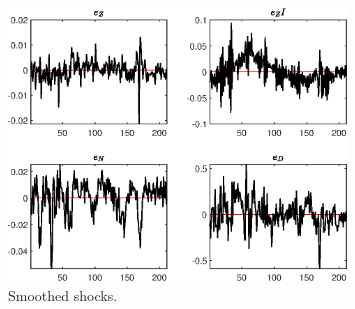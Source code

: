  
\begin{figure}[H]
\centering 
\includegraphics[width=0.80\textwidth]{BRS_fd/graphs/BRS_fd_SmoothedShocks1}
\caption{Smoothed shocks.}\label{Fig:SmoothedShocks:1}
\end{figure}


